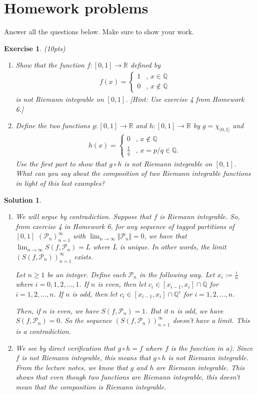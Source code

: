 \documentclass[12pt]{article}
\newcommand{\bR}{\mathbb{R}}
\newcommand{\bQ}{\mathbb{Q}}
\newcommand{\cP}{\mathcal{P}}
\newcommand{\ra}{\rightarrow}
\theoremstyle{plain}
\newtheorem{exer}{\textbf{Exercise}}}
\theoremstyle{plain}
\newtheorem*{sol}{\textbf{Solution}}}
\theoremstyle{plain}
\theoremstyle{plain}
\begin{document}
\section{Homework problems}
Answer all the questions below. Make sure to show your work.

\begin{exer}
(10pts)
\begin{enumerate}[label=\textbf{\alph*)}]
\item Show that the function $f : [0, 1] \ra \bR$ defined by	
	\begin{align*}
	f(x) = \begin{cases}
	1 &\text{, } x \in \bQ \\
	0 &\text{, } x \not\in \bQ
	\end{cases}
	\end{align*}
is not Riemann integrable on $[0, 1]$. [Hint: Use exercise 4 from Homework 6.]
\item Define the two functions $g : [0, 1] \ra \bR$ and $h : [0, 1] \ra \bR$ by $g = \chi_{(0, 1]}$ and
	\begin{align*}
	h (x) = \begin{cases}
	0 & \text{, } x \not\in \bQ \\
	\frac{1}{q} & \text{, } x = p/q \in \bQ .
	\end{cases}
	\end{align*}
Use the first part to show that $g \circ h$ is not Riemann integrable on $[0, 1]$. What can you say about the composition of two Riemann integrable functions in light of this last examples?
\end{enumerate}
\end{exer}
\begin{sol}
\begin{enumerate}
\item We will argue by contradiction. Suppose that $f$ is Riemann integrable. So, from exercise 4 in Homework 6, for any sequence of tagged partitions of $[0, 1]$ $(\cP_n )_{n = 1}^\infty$ with $\lim_{n \ra \infty} \Vert \cP_n \Vert = 0$, we have that $\lim_{n \ra \infty} S (f, \cP_n ) = L$ where $L$ is unique. In other words, the limit $(S (f, \cP_n ))_{n = 1}^\infty$ exists. 

Let $n \geq 1$ be an integer. Define each $\cP_n$ in the following way. Let $x_i := \frac{i}{n}$ where $i = 0, 1, 2, \ldots , 1$. 
If $n$ is even, then let $c_i \in [x_{i-1}, x_i] \cap \bQ$ for $i = 1, 2, \ldots , n$. If $n$ is odd, then let $c_i \in [x_{i-1}, x_i] \cap \bQ^c$ for $i = 1, 2, \ldots , n$. 

Then, if $n$ is even, we have $S(f, \cP_n) = 1$. But it $n$ is odd, we have $S(f, \cP_n) = 0$. So the sequence $(S(f, \cP_n))_{n = 1}^\infty$ doesn't have a limit. This is a contradiction.
\item We see by direct verification that $g \circ h = f$ where $f$ is the function in a). Since $f$ is not Riemann integrable, this means that $g \circ h$ is not Riemann integrable. From the lecture notes, we know that $g$ and $h$ are Riemann integrable. This shows that even though two functions are Riemann integrable, this doesn't mean that the composition is Riemann integrable.
\end{enumerate}
\end{sol}
\end{document}
